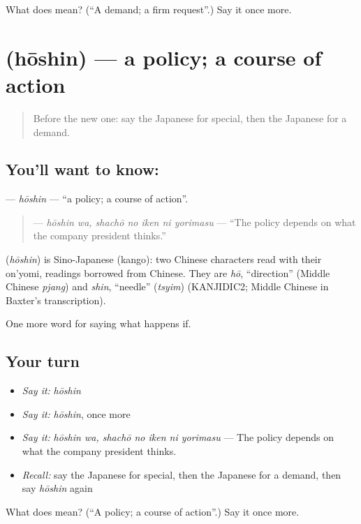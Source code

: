\begin{tcolorbox}[breakable,colback=teal!4,colframe=teal!35!black,title={Before you move on}]
What does  mean? (\textquotedblleft{}A demand; a firm request\textquotedblright{}.) Say it once more.
\end{tcolorbox}
\section[\texorpdfstring{\ja{ほうしん} (hōshin)}{ほうしん (hōshin)}]{ (hōshin) — a policy; a course of action}

\label{lesson:JA-C369-houshin}



\begin{quote}
Before the new one: say the Japanese for special, then the Japanese for a demand.
\end{quote}

\subsection*{You'll want to know: }
\textbf{} — \emph{hōshin} — \textquotedblleft{}a policy; a course of action\textquotedblright{}.

\begin{quote}
\textbf{  } — \emph{hōshin wa, shachō no iken ni yorimasu} — \textquotedblleft{}The policy depends on what the company president thinks.\textquotedblright{}
\end{quote}

\begin{cousinweb}
\textbf{} (\emph{hōshin}) is Sino-Japanese (kango): two Chinese characters read with their on'yomi, readings borrowed from Chinese. They are \emph{hō}, \textquotedblleft{}direction\textquotedblright{} (Middle Chinese \emph{pjang}) and \emph{shin}, \textquotedblleft{}needle\textquotedblright{} (\emph{tsyim}) (KANJIDIC2; Middle Chinese in Baxter's transcription).
\end{cousinweb}

\begin{grammarlens}[title={What you've built}]
One more word for saying what happens if.
\end{grammarlens}

\subsection*{Your turn}
\begin{itemize}
\raggedright
  \item \emph{Say it:} \emph{hōshin}
  \item \emph{Say it:} \emph{hōshin}, once more
  \item \emph{Say it:} \emph{hōshin wa, shachō no iken ni yorimasu} — The policy depends on what the company president thinks.
  \item \emph{Recall:} say the Japanese for special, then the Japanese for a demand, then say \emph{hōshin} again
\end{itemize}

\begin{tcolorbox}[breakable,colback=teal!4,colframe=teal!35!black,title={Before you move on}]
What does  mean? (\textquotedblleft{}A policy; a course of action\textquotedblright{}.) Say it once more.
\end{tcolorbox}
